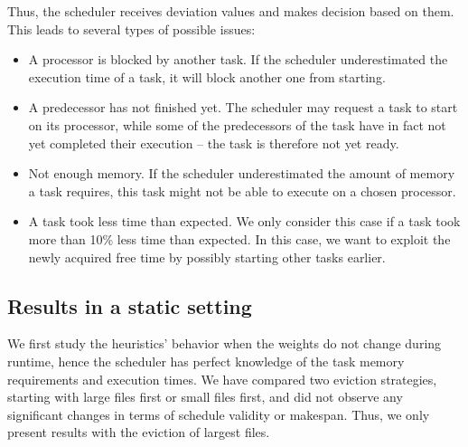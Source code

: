 \documentclass[conference]{IEEEtran}
\begin{document}
Thus, the scheduler receives deviation values and makes decision based on them.
This leads to several types of possible issues:
%
\begin{itemize}
\item 
  A processor is blocked by another task. If the scheduler underestimated the execution time of a task,
  it will block another one from starting.
\item 
  A predecessor has not finished yet.
  The scheduler may request a task to start on its processor, while
  some of the predecessors of the task have in fact not yet completed their execution -- 
  the task is therefore not yet ready.
\item 
  Not enough memory. If the scheduler underestimated the amount of memory a task requires, this task might not be able to execute on a chosen processor.
\item 
  A task took less time than expected. We only consider this case if a task took more than 10\% less
  time than expected. In this case, we want to exploit the newly acquired free time by possibly starting other tasks earlier.
\end{itemize}


\subsection{Results in a static setting}
\label{sec.expe.static}
%
We first study the heuristics' behavior when the weights do not change during runtime,
hence the scheduler has perfect knowledge of the task memory requirements and execution times.
We have compared two eviction strategies, starting with large files first or small files first,
and did not observe any significant changes in terms of schedule validity or makespan.
Thus, we only present results with the eviction of largest files. %

\end{document}
